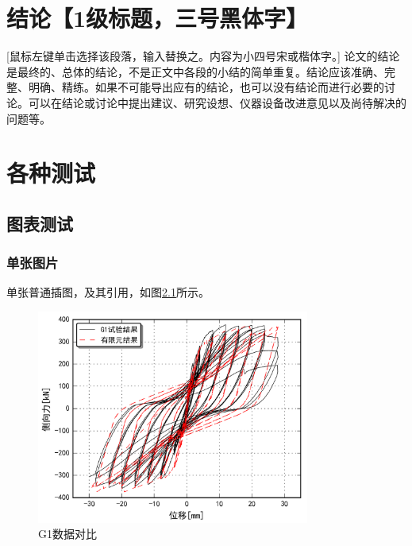 \documentclass{bjtu-bachelor-thesis}
\begin{document}
\chapter{结论【1级标题，三号黑体字】 }
 [鼠标左键单击选择该段落，输入替换之。内容为小四号宋或楷体字。] 论文的结论是最终的、总体的结论，不是正文中各段的小结的简单重复。结论应该准确、完整、明确、精练。如果不可能导出应有的结论，也可以没有结论而进行必要的讨论。可以在结论或讨论中提出建议、研究设想、仪器设备改进意见以及尚待解决的问题等。

\chapter{各种测试}
\section{图表测试}
\subsection{单张图片}
单张普通插图，及其引用，如图\ref{fig:G1}所示。

\begin{figure}[!htp]
    \centering
    \includegraphics[width=0.8\textwidth]{pic/G1.png}
    \caption{G1数据对比\label{fig:G1}}
\end{figure}
\end{document}
